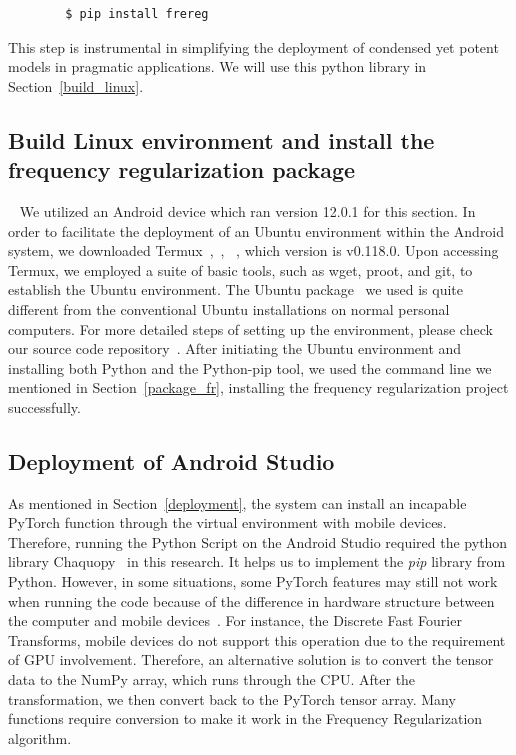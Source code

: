 \documentclass[conference]{IEEEtran}
\begin{document}
	\begin{verbatim}
		$ pip install frereg
	\end{verbatim}

This step is instrumental in simplifying the deployment of condensed yet potent models in pragmatic applications. We will use this python library in Section~\ref{build_linux}.

\subsection{Build Linux environment and install the frequency regularization package} ~\label{build_linux}
We utilized an Android device which ran version 12.0.1 for this section. In order to facilitate the deployment of an Ubuntu environment within the Android system, we downloaded Termux~\cite{termux_repo},~\cite{termux_overview},~\cite{termux_wiki} , which version is v0.118.0. Upon accessing Termux, we employed a suite of basic tools, such as wget, proot, and git, to establish the Ubuntu environment. The Ubuntu package~\cite{ubuntu_in_termux_repo} we used is quite different from the conventional Ubuntu installations on normal personal computers. For more detailed steps of setting up the environment, please check our source code repository~\cite{nerual_on_mobile_repo}. After initiating the Ubuntu environment and installing both Python and the Python-pip tool, we used the command line we mentioned in Section~\ref{package_fr}, installing the frequency regularization project successfully.


\subsection{Deployment of Android Studio}
As mentioned in Section~\ref{deployment}, the system can install an incapable PyTorch function through the virtual environment with mobile devices. Therefore, running the Python Script on the Android Studio required the python library Chaquopy~\cite{chaquopy2023} in this research. It helps us to implement the \textit{pip} library from Python. However, in some situations, some PyTorch features may still not work when running the code because of the difference in hardware structure between the computer and mobile devices~\cite{fojtik2022cpu}. For instance, the Discrete Fast Fourier Transforms, mobile devices do not support this operation due to the requirement of GPU involvement. Therefore, an alternative solution is to convert the tensor data to the NumPy array, which runs through the CPU. After the transformation, we then convert back to the PyTorch tensor array. Many functions require conversion to make it work in the Frequency Regularization algorithm. 
\end{document}
